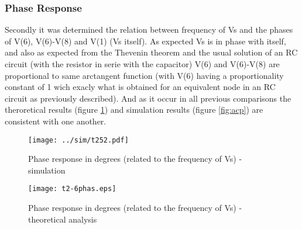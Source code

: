 
\subsubsection{Phase Response}

Secondly it was determined the relation between frequency of Vs and the phases of V(6), V(6)-V(8) and V(1) (Vs itself). As expected Vs is in phase with itself, and also as expected from the Thevenin theorem  and the usual solution of an RC circuit (with the resistor in serie with the capacitor) V(6) and V(6)-V(8) are proportional to same arctangent function (with V(6) having a proportionality constant of 1 wich exacly what is obtained for an equivalent node in an RC circuit as previously described). And as it occur in all previous comparisons the theroretical results (figure \ref{fig:comphas}) and simulation results (figure \ref{fig:acp}) are consistent with one another.

\begin{figure}[h] \centering
  \begin{minipage}{.5\textwidth}
    \texttt{[image: ../sim/t252.pdf]}
    \caption{Phase response in degrees (related to the frequency of Vs) - simulation}
    \label{fig:acp}
    \end{minipage}%
  \begin{minipage}{.5\textwidth}
    \vspace{10mm}
  \centering
    \texttt{[image: t2-6phas.eps]}
    \caption{Phase response in degrees (related to the frequency of Vs) - theoretical analysis}
    \label{fig:comphas}
      \end{minipage}%
\end{figure}





